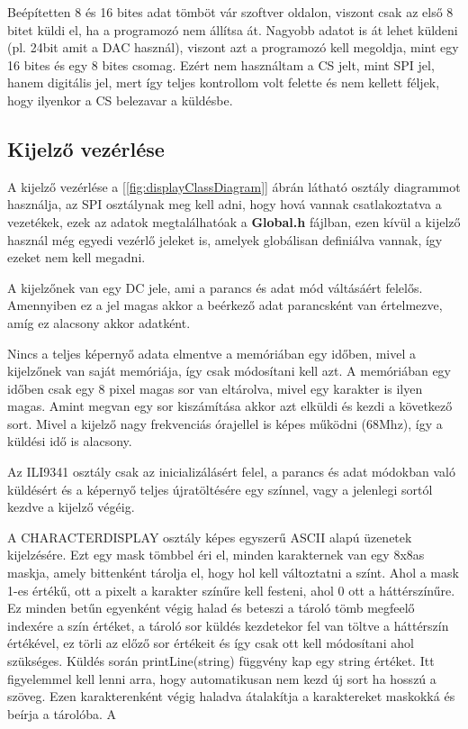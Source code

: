 Beépítetten 8 és 16 bites adat tömböt vár szoftver oldalon, viszont csak az első
8 bitet küldi el, ha a programozó nem állítsa át. Nagyobb adatot is át lehet 
küldeni (pl. 24bit amit a DAC használ), viszont azt a programozó kell megoldja,
mint egy 16 bites és egy 8 bites csomag. Ezért nem használtam a CS jelt, mint 
SPI jel, hanem digitális jel, mert így teljes kontrollom volt felette és nem 
kellett féljek, hogy ilyenkor a CS belezavar a küldésbe.


\subsection{Kijelző vezérlése}

A kijelző vezérlése a [\ref{fig:displayClassDiagram}] ábrán látható osztály diagrammot használja, 
az SPI osztálynak meg kell adni, hogy hová vannak csatlakoztatva a vezetékek, 
ezek az adatok megtalálhatóak a \textbf{Global.h} fájlban, ezen kívül a 
kijelző használ még egyedi vezérlő jeleket is, amelyek globálisan definiálva vannak,
így ezeket nem kell megadni. 

A kijelzőnek van egy DC jele, ami a parancs és adat mód váltásáért felelős.
Amennyiben ez a jel magas akkor a beérkező adat parancsként van értelmezve, amíg 
ez alacsony akkor adatként.

Nincs a teljes képernyő adata elmentve a memóriában egy időben, mivel a kijelzőnek
van saját memóriája, így csak módosítani kell azt. A memóriában egy időben csak 
egy 8 pixel magas sor van eltárolva, mivel egy karakter is ilyen magas.
Amint megvan egy sor kiszámítása akkor azt elküldi és kezdi a következő sort.
Mivel a kijelző nagy frekvenciás órajellel is képes működni (68Mhz), így a küldési
idő is alacsony.

Az ILI9341 osztály csak az inicializálásért felel, a parancs és adat 
módokban való küldésért és a képernyő teljes újratöltésére egy színnel, vagy a jelenlegi
sortól kezdve a kijelző végéig.

A CHARACTERDISPLAY osztály képes egyszerű ASCII alapú üzenetek kijelzésére.
Ezt egy mask tömbbel éri el, minden karakternek van egy 8x8as maskja, amely
bittenként tárolja el, hogy hol kell változtatni a színt.
Ahol a mask 1-es értékű, ott a pixelt a karakter színűre kell festeni, ahol 0
ott a háttérszínűre.
Ez minden betűn egyenként végig halad és beteszi a tároló tömb megfeelő indexére
a szín értéket, a tároló sor küldés kezdetekor fel van töltve a háttérszín 
értékével, ez törli az előző sor értékeit és így csak ott kell módosítani
ahol szükséges.
Küldés során printLine(string) függvény kap egy string értéket.
Itt figyelemmel kell lenni arra, hogy automatikusan nem kezd új sort
ha hosszú a szöveg. Ezen karakterenként végig haladva átalakítja a karaktereket maskokká
és beírja a tárolóba. A 


